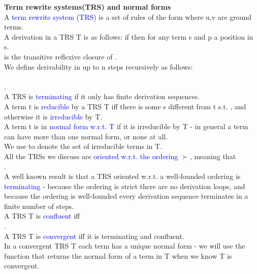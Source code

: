 \textbf{Term rewrite systems(TRS) and normal forms}\\
A \textcolor{blue}{term rewrite system (TRS)} is a set of rules of the form  where u,v are ground terms.\\
A derivation in a TRS T is as follows: if  then  for any term s and p a position in s.\\
 is the transitive reflexive closure of .\\
We define derivability in up to n steps recursively as follows:\\
\\
.\\
A TRS is \textcolor{blue}{terminating} if it only has finite derivation sequences.\\
A term t is \textcolor{blue}{reducible} by a TRS T iff there is some s different from t s.t. , and otherwise it is \textcolor{blue}{irreducible} by T.\\
A term t is in \textcolor{blue}{normal form w.r.t. T} if it is irreducible by T - in general a term can have more than one normal form, or none at all.\\
We use  to denote the set of irreducible terms in T.\\
All the TRSs we discuss are \textcolor{blue}{oriented w.r.t. the ordering} $\succ$, meaning that \\
.\\
A well known result is that a TRS oriented w.r.t. a well-founded ordering is \textcolor{blue}{terminating} 
- because the ordering is strict there are no derivation loops, and because the ordering is well-founded every derivation sequence terminates in a finite number of steps.\\
A TRS T is \textcolor{blue}{confluent} iff \\
 .\\
A TRS T is \textcolor{blue}{convergent} iff it is terminating and confluent.\\
In a convergent TRS T each term has a unique normal form - we will use the function  that returns the normal form of a term in T when we know T is convergent.\\
